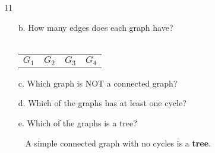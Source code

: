 \documentclass[a4paper,12pt]{book}
\newcounter{question}
\begin{document}
\begin{question}{\thequestion}{11}
\begin{itemize}
        \item[b.]   How many edges does each graph have? ~\\~\\
        \begin{tabular}{p{3cm} p{3cm} p{3cm} p{3cm}}
            $G_{1}$     \solution{}{ \fitb }
            & $G_{2}$   \solution{}{ \fitb }
            & $G_{3}$   \solution{}{ \fitb }
            & $G_{4}$   \solution{}{ \fitb }
        \end{tabular} \vspace{0.2cm}
        \item[c.] Which graph is NOT a connected graph?
            \solution{}{}
        \item[d.] Which of the graphs has at least one cycle?
            \solution{}{}
        \item[e.] Which of the graphs is a tree?
            \begin{hint}{\ }
                A simple connected graph with no cycles is a \textbf{tree}.
            \end{hint}
    \end{itemize}

\end{question}

\notonkey{ \newpage }{ \hrulefill }
\end{document}
